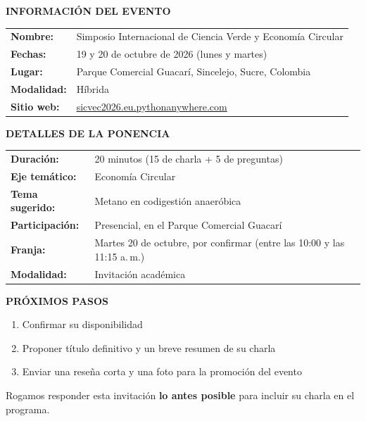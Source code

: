 \documentclass[11pt,a4paper]{article}
\begin{document}
\vspace{0.3cm}

\noindent
\textbf{INFORMACIÓN DEL EVENTO}

\renewcommand{\arraystretch}{1.3}
\begin{tabular}{ll}
\textbf{Nombre:} & Simposio Internacional de Ciencia Verde y Economía Circular \\
\textbf{Fechas:} & 19 y 20 de octubre de 2026 (lunes y martes) \\
\textbf{Lugar:} & Parque Comercial Guacarí, Sincelejo, Sucre, Colombia \\
\textbf{Modalidad:} & Híbrida \\
\textbf{Sitio web:} & \href{https://sicvec2026.eu.pythonanywhere.com}{sicvec2026.eu.pythonanywhere.com} \\
\end{tabular}

\vspace{0.3cm}

\needspace{8cm}
\noindent
\textbf{DETALLES DE LA PONENCIA}

\begin{tabular}{ll}
\textbf{Duración:} & 20 minutos (15 de charla + 5 de preguntas) \\
\textbf{Eje temático:} & Economía Circular \\
\textbf{Tema sugerido:} & Metano en codigestión anaeróbica \\
\textbf{Participación:} & Presencial, en el Parque Comercial Guacarí \\
\textbf{Franja:} & Martes 20 de octubre, por confirmar (entre las 10:00 y las 11:15 a.\,m.) \\
\textbf{Modalidad:} & Invitación académica \\
\end{tabular}

\vspace{0.3cm}

\needspace{4cm}
\noindent
\textbf{PRÓXIMOS PASOS}

\begin{enumerate}
  \item Confirmar su disponibilidad
  \item Proponer título definitivo y un breve resumen de su charla
  \item Enviar una reseña corta y una foto para la promoción del evento
\end{enumerate}

Rogamos responder esta invitación \textbf{lo antes posible} para incluir su charla en el programa.
\end{document}
